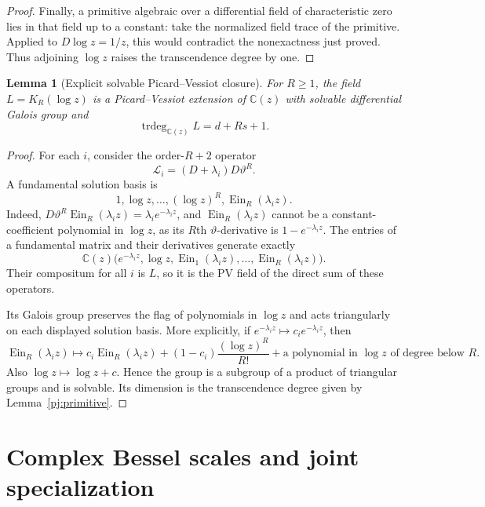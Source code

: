 \documentclass[11pt]{article}
\newtheorem{lemma}[theorem]{Lemma}
\theoremstyle{definition}
\theoremstyle{remark}
\newcommand{\Ein}{\operatorname{Ein}}
\begin{document}
\begin{proof}
Finally, a primitive algebraic over a differential field of
characteristic zero lies in that field up to a constant: take the
normalized field trace of the primitive. Applied to $D\log z=1/z$,
this would contradict the nonexactness just proved. Thus adjoining
$\log z$ raises the transcendence degree by one.
\end{proof}

\begin{lemma}[Explicit solvable Picard--Vessiot closure]\label{pj:pv}
For $R\ge1$, the field $L=K_R(\log z)$ is a Picard--Vessiot extension
of $\mathbb C(z)$ with solvable differential Galois group and
\[
 \operatorname{trdeg}_{\mathbb C(z)}L=d+Rs+1.
\]
\end{lemma}
\begin{proof}
For each $i$, consider the order-$R+2$ operator
\[
 \mathcal L_i=(D+\lambda_i)D\vartheta^R.
\]
A fundamental solution basis is
\[
 1,\log z,\ldots,(\log z)^R,\Ein_R(\lambda_i z).
\]
Indeed, $D\vartheta^R \Ein_R(\lambda_i z)=\lambda_i e^{-\lambda_i z}$,
and $\Ein_R(\lambda_i z)$ cannot be a constant-coefficient polynomial in
$\log z$, as its $R$th $\vartheta$-derivative is $1-e^{-\lambda_i z}$.
The entries of a fundamental matrix and their derivatives generate
exactly
\[
 \mathbb C(z)\bigl(e^{-\lambda_i z},\log z,
                   \Ein_1(\lambda_i z),\ldots,\Ein_R(\lambda_i z)\bigr).
\]
Their compositum for all $i$ is $L$, so it is the PV field of the
direct sum of these operators.

Its Galois group preserves the flag of polynomials in $\log z$ and
acts triangularly on each displayed solution basis. More explicitly,
if $e^{-\lambda_i z}\mapsto c_i e^{-\lambda_i z}$, then
\[
 \Ein_R(\lambda_i z)\mapsto
 c_i \Ein_R(\lambda_i z)
 +(1-c_i)\frac{(\log z)^R}{R!}
 +\text{a polynomial in $\log z$ of degree below $R$}.
\]
Also $\log z\mapsto\log z+c$. Hence the group is a subgroup of a
product of triangular groups and is solvable. Its dimension is the
transcendence degree given by Lemma~\ref{pj:primitive}.
\end{proof}


\section{Complex Bessel scales and joint specialization}
\label{cf:section}
\end{document}
